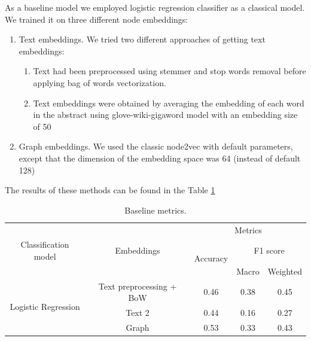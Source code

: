 As a baseline model we employed logistic regression classifier as a classical model. We trained it on three different node embeddings:
\begin{enumerate}

\item[1.] Text embeddings. \newline
We tried two different approaches of getting text embeddings:
\begin{enumerate}
\item[a)] Text had been preprocessed using stemmer and stop words removal before applying bag of words vectorization.
\item[b)] Text embeddings were obtained by averaging the embedding of each word in the abstract using glove-wiki-gigaword model with an embedding size of 50
\end{enumerate}

\item[2.] Graph embeddings.\newline
We used the classic node2vec with default parameters, except that the dimension of the embedding space was 64 (instead of default 128)
\end{enumerate}

The results of these methods can be found in the Table \ref{table:baseline_metrics}

\begin{table}[h]
\centering
\begin{tabular}{c c  c c c}
\hline\hline
 & & \multicolumn{3}{c}{Metrics} \\
\cline{3-5}
Classification model & Embeddings & \multirow{2}{*}{Accuracy} & \multicolumn{2}{c}{F1 score} \\
 & & & Macro & Weighted \\
\hline
\multirow{3}{*}{Logistic Regression} & Text preprocessing + BoW & 0.46 & 0.38 & 0.45 \\
 & Text 2 & 0.44 & 0.16 & 0.27 \\
 & Graph & 0.53 & 0.33 & 0.43 \\
\hline
\end{tabular}
\caption{Baseline metrics.}
\label{table:baseline_metrics}
\end{table}

